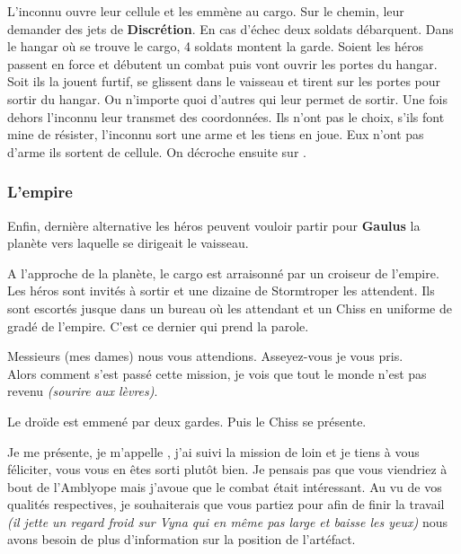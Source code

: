 L’inconnu ouvre leur cellule et les emmène au cargo. Sur le chemin, leur demander des jets de \textbf{Discrétion}. En cas d’échec deux soldats débarquent. Dans le hangar où se trouve le cargo, 4 soldats montent la garde. Soient les héros passent en force et débutent un combat puis vont ouvrir les portes du hangar. Soit ils la jouent furtif, se glissent dans le vaisseau et tirent sur les portes pour sortir du hangar. Ou n’importe quoi d’autres qui leur permet de sortir. Une fois dehors l’inconnu leur transmet des coordonnées. Ils n’ont pas le choix, s’ils font mine de résister, l’inconnu sort une arme et les tiens en joue. Eux n’ont pas d’arme ils sortent de cellule. On décroche ensuite sur .



\subsubsection{L’empire} \label{sec:l-empire}
Enfin, dernière alternative les héros peuvent vouloir partir pour \textbf{Gaulus} la planète vers laquelle se dirigeait le vaisseau. 

A l’approche de la planète, le cargo est arraisonné par un croiseur de l’empire. Les héros sont invités à sortir et une dizaine de Stormtroper les attendent. Ils sont escortés jusque dans un bureau où les attendant  et un Chiss en uniforme de gradé de l’empire. C’est ce dernier qui prend la parole.

\begin{quotebox}
    Messieurs (mes dames) nous vous attendions. Asseyez-vous je vous pris. \\
    Alors comment s’est passé cette mission, je vois que tout le monde n’est pas revenu \emph{(sourire aux lèvres)}. 
\end{quotebox}

Le droïde est emmené par deux gardes. Puis le Chiss se présente.

\begin{quotebox}
    Je me présente, je m’appelle , j’ai suivi la mission de loin et je tiens à vous féliciter, vous vous en êtes sorti plutôt bien. Je pensais pas que vous viendriez à bout de l’Amblyope mais j’avoue que le combat était intéressant. Au vu de vos qualités respectives, je souhaiterais que vous partiez pour  afin de finir la travail \emph{(il jette un regard froid sur Vyna qui en même pas large et baisse les yeux)} nous avons besoin de plus d’information sur la position de l’artéfact.
\end{quotebox}

